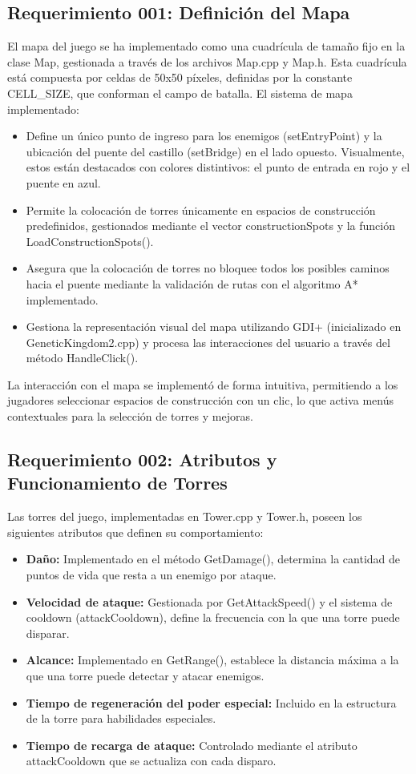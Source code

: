\documentclass[a4paper,num-refs]{oup-contemporary}
\begin{document}
\subsection{Requerimiento 001: Definición del Mapa}
El mapa del juego se ha implementado como una cuadrícula de tamaño fijo en la clase Map, gestionada a través de los archivos Map.cpp y Map.h. Esta cuadrícula está compuesta por celdas de 50x50 píxeles, definidas por la constante CELL_SIZE, que conforman el campo de batalla. El sistema de mapa implementado:

\begin{itemize}
    \item Define un único punto de ingreso para los enemigos (setEntryPoint) y la ubicación del puente del castillo (setBridge) en el lado opuesto. Visualmente, estos están destacados con colores distintivos: el punto de entrada en rojo y el puente en azul.
    \item Permite la colocación de torres únicamente en espacios de construcción predefinidos, gestionados mediante el vector constructionSpots y la función LoadConstructionSpots().
    \item Asegura que la colocación de torres no bloquee todos los posibles caminos hacia el puente mediante la validación de rutas con el algoritmo A* implementado.
    \item Gestiona la representación visual del mapa utilizando GDI+ (inicializado en GeneticKingdom2.cpp) y procesa las interacciones del usuario a través del método HandleClick().
\end{itemize}

La interacción con el mapa se implementó de forma intuitiva, permitiendo a los jugadores seleccionar espacios de construcción con un clic, lo que activa menús contextuales para la selección de torres y mejoras.

\subsection{Requerimiento 002: Atributos y Funcionamiento de Torres}
Las torres del juego, implementadas en Tower.cpp y Tower.h, poseen los siguientes atributos que definen su comportamiento:

\begin{itemize}
    \item \textbf{Daño:} Implementado en el método GetDamage(), determina la cantidad de puntos de vida que resta a un enemigo por ataque.
    \item \textbf{Velocidad de ataque:} Gestionada por GetAttackSpeed() y el sistema de cooldown (attackCooldown), define la frecuencia con la que una torre puede disparar.
    \item \textbf{Alcance:} Implementado en GetRange(), establece la distancia máxima a la que una torre puede detectar y atacar enemigos.
    \item \textbf{Tiempo de regeneración del poder especial:} Incluido en la estructura de la torre para habilidades especiales.
    \item \textbf{Tiempo de recarga de ataque:} Controlado mediante el atributo attackCooldown que se actualiza con cada disparo.
\end{itemize}
\end{document}
